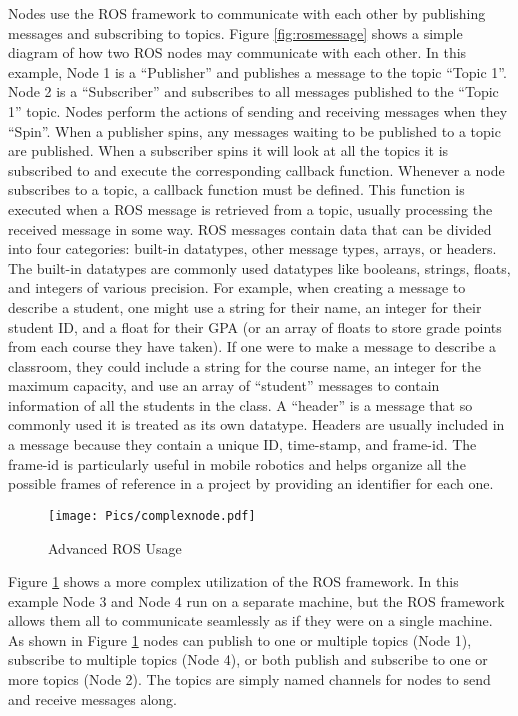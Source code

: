 Nodes use the ROS framework to communicate with each other by publishing messages and subscribing to topics. Figure \ref{fig:rosmessage} shows a simple diagram of how two ROS nodes may communicate with each other. In this example, Node 1 is a ``Publisher'' and publishes a message to the topic ``Topic 1''. Node 2 is a ``Subscriber'' and subscribes to all messages published to the ``Topic 1'' topic. Nodes perform the actions of sending and receiving messages when they ``Spin''. When a publisher spins, any messages waiting to be published to a topic are published. When a subscriber spins it will look at all the topics it is subscribed to and execute the corresponding callback function. Whenever a node subscribes to a topic, a callback function must be defined. This function is executed when a ROS message is retrieved from a topic, usually processing the received message in some way. ROS messages contain data that can be divided into four categories: built-in datatypes, other message types, arrays, or headers. The built-in datatypes are commonly used datatypes like booleans, strings, floats, and integers of various precision. For example, when creating a message to describe a student, one might use a string for their name, an integer for their student ID, and a float for their GPA (or an array of floats to store grade points from each course they have taken). If one were to make a message to describe a classroom, they could include a string for the course name, an integer for the maximum capacity, and use an array of ``student'' messages to contain information of all the students in the class. A ``header'' is a message that so commonly used it is treated as its own datatype. Headers are usually included in a message because they contain a unique ID, time-stamp, and frame-id. The frame-id is particularly useful in mobile robotics and helps organize all the possible frames of reference in a project by providing an identifier for each one.\\

\begin{figure}[h!]
    \centering
    \texttt{[image: Pics/complexnode.pdf]}
    \caption{Advanced ROS Usage}
    \label{fig:roscomplex}
\end{figure}

Figure \ref{fig:roscomplex} shows a more complex utilization of the ROS framework. In this example Node 3 and Node 4 run on a separate machine, but the ROS framework allows them all to communicate seamlessly as if they were on a single machine. As shown in Figure \ref{fig:roscomplex} nodes can publish to one or multiple topics (Node 1), subscribe to multiple topics (Node 4), or both publish and subscribe to one or more topics (Node 2). The topics are simply named channels for nodes to send and receive messages along.\\

